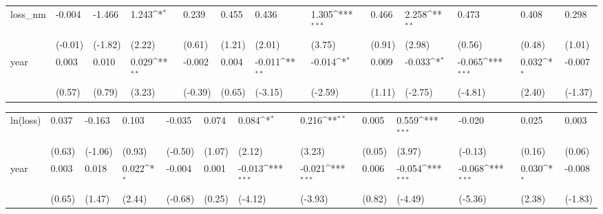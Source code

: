 \def\sym#1{\ifmmode^{#1}\else\(^{#1}\)\fi}
\begin{tabular}{p{1.5cm} p{1.7cm} p{1.7cm} p{1.7cm}  p{1.7cm} p{1.7cm} p{1.7cm} p{1.7cm} p{1.7cm}  p{1.7cm} p{1.7cm} p{1.7cm} p{1.7cm} }
\hline
loss\_nm         &   -0.004         &   -1.466         &    1.243\sym{*}  &    0.239         &    0.455         &    0.436         &    1.305\sym{***}&    0.466         &    2.258\sym{**} &    0.473         &    0.408         &    0.298         \\
                &  (-0.01)         &  (-1.82)         &   (2.22)         &   (0.61)         &   (1.21)         &   (2.01)         &   (3.75)         &   (0.91)         &   (2.98)         &   (0.56)         &   (0.48)         &   (1.01)         \\
year            &    0.003         &    0.010         &    0.029\sym{**} &   -0.002         &    0.004         &   -0.011\sym{**} &   -0.014\sym{*}  &    0.009         &   -0.033\sym{*}  &   -0.065\sym{***}&    0.032\sym{*}  &   -0.007         \\
                &   (0.57)         &   (0.79)         &   (3.23)         &  (-0.39)         &   (0.65)         &  (-3.15)         &  (-2.59)         &   (1.11)         &  (-2.75)         &  (-4.81)         &   (2.40)         &  (-1.37)         \\
\end{tabular}
\def\sym#1{\ifmmode^{#1}\else\(^{#1}\)\fi}
\begin{tabular}{p{1.5cm} p{1.7cm} p{1.7cm} p{1.7cm}  p{1.7cm} p{1.7cm} p{1.7cm} p{1.7cm} p{1.7cm}  p{1.7cm} p{1.7cm} p{1.7cm} p{1.7cm} }
\hline
ln(loss)        &    0.037         &   -0.163         &    0.103         &   -0.035         &    0.074         &    0.084\sym{*}  &    0.216\sym{**} &    0.005         &    0.559\sym{***}&   -0.020         &    0.025         &    0.003         \\
                &   (0.63)         &  (-1.06)         &   (0.93)         &  (-0.50)         &   (1.07)         &   (2.12)         &   (3.23)         &   (0.05)         &   (3.97)         &  (-0.13)         &   (0.16)         &   (0.06)         \\
year            &    0.003         &    0.018         &    0.022\sym{*}  &   -0.004         &    0.001         &   -0.013\sym{***}&   -0.021\sym{***}&    0.006         &   -0.054\sym{***}&   -0.068\sym{***}&    0.030\sym{*}  &   -0.008         \\
                &   (0.65)         &   (1.47)         &   (2.44)         &  (-0.68)         &   (0.25)         &  (-4.12)         &  (-3.93)         &   (0.82)         &  (-4.49)         &  (-5.36)         &   (2.38)         &  (-1.83)         \\
\end{tabular}
